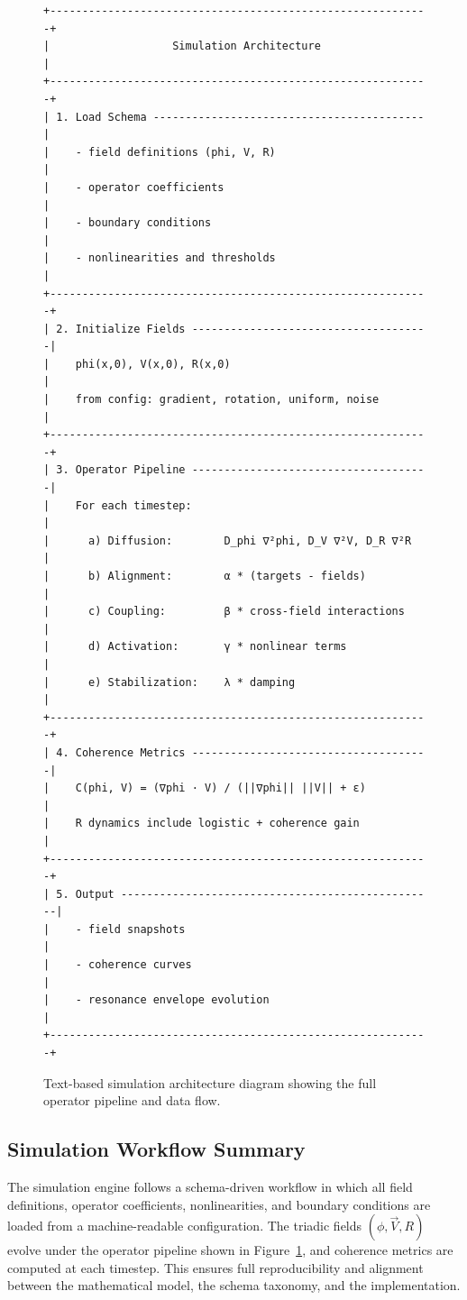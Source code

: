 \documentclass[12pt]{article}
\begin{document}
\begin{figure}[h]
\centering
\begin{verbatim}
+-----------------------------------------------------------+
|                   Simulation Architecture                 |
+-----------------------------------------------------------+
| 1. Load Schema ------------------------------------------ |
|    - field definitions (phi, V, R)                        |
|    - operator coefficients                                |
|    - boundary conditions                                  |
|    - nonlinearities and thresholds                        |
+-----------------------------------------------------------+
| 2. Initialize Fields -------------------------------------|
|    phi(x,0), V(x,0), R(x,0)                               |
|    from config: gradient, rotation, uniform, noise        |
+-----------------------------------------------------------+
| 3. Operator Pipeline -------------------------------------|
|    For each timestep:                                     |
|      a) Diffusion:        D_phi ∇²phi, D_V ∇²V, D_R ∇²R   |
|      b) Alignment:        α * (targets - fields)          |
|      c) Coupling:         β * cross-field interactions    |
|      d) Activation:       γ * nonlinear terms             |
|      e) Stabilization:    λ * damping                     |
+-----------------------------------------------------------+
| 4. Coherence Metrics -------------------------------------|
|    C(phi, V) = (∇phi · V) / (||∇phi|| ||V|| + ε)          |
|    R dynamics include logistic + coherence gain           |
+-----------------------------------------------------------+
| 5. Output -------------------------------------------------|
|    - field snapshots                                      |
|    - coherence curves                                     |
|    - resonance envelope evolution                         |
+-----------------------------------------------------------+
\end{verbatim}
\caption{Text-based simulation architecture diagram showing the full
operator pipeline and data flow.}
\label{fig:sim-architecture}
\end{figure}

\subsection{Simulation Workflow Summary}

The simulation engine follows a schema-driven workflow in which all field
definitions, operator coefficients, nonlinearities, and boundary conditions
are loaded from a machine-readable configuration. The triadic fields
$(\phi, \vec{V}, R)$ evolve under the operator pipeline shown in
Figure~\ref{fig:sim-architecture}, and coherence metrics are computed at
each timestep. This ensures full reproducibility and alignment between the
mathematical model, the schema taxonomy, and the implementation.
\end{document}
